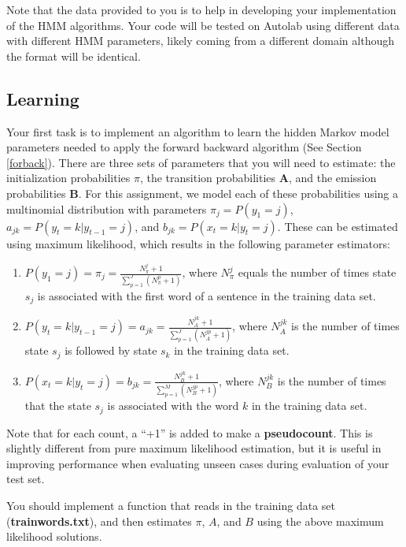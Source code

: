 \documentclass[11pt,addpoints,answers]{exam}
\numberwithin{equation}{section} %
\numberwithin{figure}{section} %
\numberwithin{table}{section} %
\begin{document}
Note that the data provided to you is to help in developing your implementation of the HMM algorithms. Your code will be tested on Autolab using different data with different HMM parameters, likely coming from a different domain although the format will be identical.

\subsection{Learning}\label{learn}
Your first task is to implement an algorithm to learn the hidden Markov model parameters needed to apply the forward backward algorithm (See Section \ref{forback}). There are three sets of parameters that you will need to estimate: the initialization probabilities {\boldmath$\pi$}, the transition probabilities $\mathbf A$, and the emission probabilities $\mathbf B$. For this assignment, we model each of these probabilities using a multinomial distribution with parameters $ \pi_j=P(y_1=j)$, $ a_{jk} = P(y_{t}=k\vert y_{t-1}=j)$, and $ b_{jk} = P(x_t=k\vert y_{t}=j)$. These can be estimated using maximum likelihood, which results in the following parameter estimators:

\begin{enumerate}
    \item $P(y_1 = j) = \pi_j = \frac{N_\pi^j+1}{\sum_{p=1}^{J}(N_\pi^p+1)}$, where $N_\pi^j$ equals the number of times state $s_j$ is associated with the first word of a sentence in the training data set.
    \item $P(y_{t} = k\vert y_{t-1}=j) = a_{jk}= \frac{N_A^{jk}+1}{\sum_{p=1}^J (N_A^{jp}+1)}$, where $N_A^{jk}$ is the number of times state $s_j$ is followed by state $s_k$ in the training data set.  
    \item $P(x_{t} = k\vert y_{t}=j) = b_{jk}= \frac{N_B^{jk}+1}{\sum_{p=1}^M (N_B^{jp}+1)}$, where $N_B^{jk}$ is the number of times that the state $s_j$ is associated with the word $k$ in the training data set.
\end{enumerate}

Note that for each count, a ``+1'' is added to make a \textbf{pseudocount}. This is slightly different from pure maximum likelihood estimation, but it is useful in improving performance when evaluating unseen cases during evaluation of your test set.

You should implement a function that reads in the training data set (\textbf{trainwords.txt}), and then estimates $\pi$, $A$, and $B$ using the above maximum likelihood solutions. 
\end{document}
